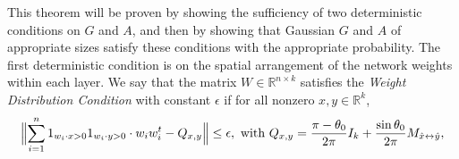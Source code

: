 \documentclass[final,12pt]{colt2018}
\newcommand{\R}{\mathbb{R}}
\newcommand{\eps}{\epsilon}
\newcommand{\xo}{x_0}
\newcommand{\indwx}{1_{w_i \cdot x > 0}}
\newcommand{\indwy}{1_{w_i \cdot y > 0}}
\newcommand{\Mxyhat}{M_{\hat{x} \leftrightarrow \hat{y}}}
\newcommand{\Qxy}{Q_{x,y}}
\begin{document}
This theorem will be proven by showing the sufficiency of two deterministic conditions on $G$ and $A$, and then by showing that Gaussian $G$ and $A$ of appropriate sizes satisfy these conditions with the appropriate probability.
The first deterministic condition is on the spatial arrangement of the network weights within each layer.  We say that the matrix $W \in \R^{n \times k}$ satisfies the \textit{Weight Distribution Condition} with constant $\eps$ if for all nonzero $x,y \in \R^k$, 
\begin{align}
\Bigl \| \sum_{i=1}^n \indwx \indwy \cdot w_i w_i^t  - \Qxy \Bigr \| \leq \eps,  \text{ with } \Qxy = \frac{\pi - \theta_0}{2 \pi} I_k + \frac{\sin \theta_0}{2\pi}  \Mxyhat, \label{WDC}
\end{align}
\end{document}
